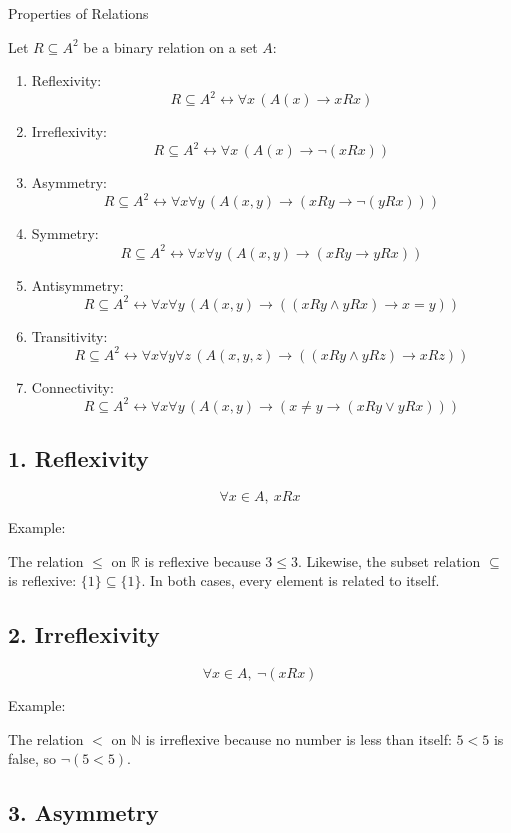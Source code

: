 Properties of Relations

Let \(R \subseteq A^2\) be a binary relation on a set \(A\):

\begin{enumerate}
\def\labelenumi{\arabic{enumi}.}
\item
  Reflexivity:
  \[R \subseteq A^2 \leftrightarrow \forall x \, (A(x) \to xRx)\]
\item
  Irreflexivity:
  \[R \subseteq A^2 \leftrightarrow \forall x \, (A(x) \to \neg (xRx))\]
\item
  Asymmetry:
  \[R \subseteq A^2 \leftrightarrow \forall x \forall y \, (A(x,y) \to (xRy \to \neg (yRx)))\]
\item
  Symmetry:
  \[R \subseteq A^2 \leftrightarrow \forall x \forall y \, (A(x,y) \to (xRy \to yRx))\]
\item
  Antisymmetry:
  \[R \subseteq A^2 \leftrightarrow \forall x \forall y \, (A(x,y) \to ((xRy \land yRx) \to x = y))\]
\item
  Transitivity:
  \[R \subseteq A^2 \leftrightarrow \forall x \forall y \forall z \, (A(x,y,z) \to ((xRy \land yRz) \to xRz))\]
\item
  Connectivity:
  \[R \subseteq A^2 \leftrightarrow \forall x \forall y \, (A(x,y) \to (x \neq y \to (xRy \lor yRx)))\]
\end{enumerate}

\subsection{1. Reflexivity}\label{reflexivity}

\[\forall x \in A, \ xRx\]

Example:

The relation \(\leq\) on \(\mathbb{R}\) is reflexive because
\(3 \leq 3\). Likewise, the subset relation \(\subseteq\) is reflexive:
\(\{1\} \subseteq \{1\}\). In both cases, every element is related to
itself.

\subsection{2. Irreflexivity}\label{irreflexivity}

\[\forall x \in A, \ \neg(xRx)\]

Example:

The relation \(<\) on \(\mathbb{N}\) is irreflexive because no number is
less than itself: \(5 < 5\) is false, so \(\neg(5<5)\).

\subsection{3. Asymmetry}\label{asymmetry}

